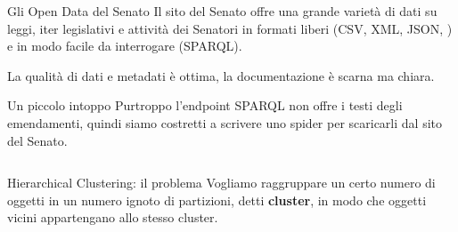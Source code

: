 \documentclass[12pt]{beamer}
\begin{document}
  \begin{frame}{Gli Open Data del Senato}
    Il sito del Senato offre una grande varietà di dati su leggi, iter
    legislativi e attività dei Senatori in formati liberi (CSV, XML, JSON,
    \textellipsis) e in modo facile da interrogare (SPARQL).

    \vspace{0.5cm}

    La qualità di dati e metadati è ottima, la documentazione è scarna ma
    chiara.
  \end{frame}

  \begin{frame}{Un piccolo intoppo}
    Purtroppo l'endpoint SPARQL non offre i testi degli emendamenti, quindi
    siamo costretti a scrivere uno spider per scaricarli dal sito del Senato.

    \vspace{0.25cm}

    \inputminted[fontsize=\tiny]{python}{tex/src/spider.py}
  \end{frame}

  \begin{frame}{Hierarchical Clustering: il problema}
    Vogliamo raggruppare un certo numero di oggetti in un numero ignoto di
    partizioni, detti \textbf{cluster}, in modo che oggetti vicini appartengano
    allo stesso cluster.

    \vspace{0.25cm}

    \begin{figure}
      \centering
    \end{figure}
  \end{frame}
\end{document}
